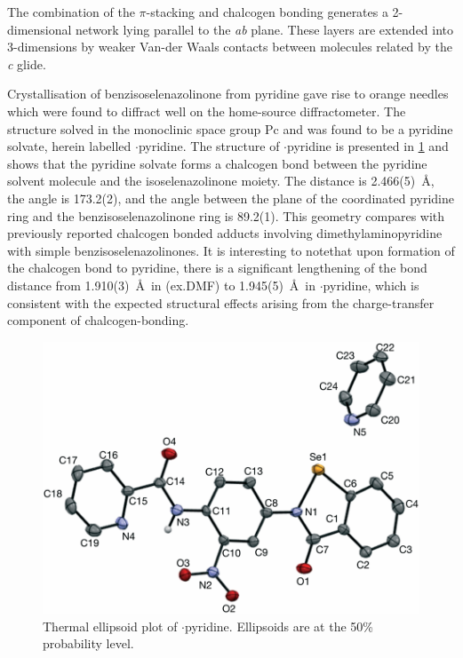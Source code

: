 \begin{refsection}
The combination of the $\pi$-stacking and chalcogen bonding generates a 2-dimensional network lying parallel to the \emph{ab} plane.
These layers are extended into 3-dimensions by weaker Van-der Waals contacts between molecules related by the \emph{c} glide.

Crystallisation of benzisoselenazolinone  from pyridine gave rise to orange needles which were found to diffract well on the home-source diffractometer.
The structure solved in the monoclinic space group Pc and was found to be a pyridine solvate, herein labelled $\cdot$pyridine.
The structure of $\cdot$pyridine is presented in \cref{fig:ebs-nitroamide-2py-py-xtal} and shows that the pyridine solvate forms a  chalcogen bond between the pyridine solvent molecule and the isoselenazolinone moiety.
The  distance is 2.466(5)~\AA, the  angle is 173.2(2)\degree, and the angle between the plane of the coordinated pyridine ring and the benzisoselenazolinone ring is 89.2(1)\degree.
This geometry compares with previously reported chalcogen bonded adducts involving dimethylaminopyridine with simple benzisoselenazolinones.\autocite{Fellowes2019}
It is interesting to notethat upon formation of the chalcogen bond to pyridine, there is a significant lengthening of the  bond distance from 1.910(3)~\AA~in (ex.DMF) to 1.945(5)~\AA~in $\cdot$pyridine, which is consistent with the expected structural effects arising from the charge-transfer component of chalcogen-bonding.\autocite{Fellowes2019,Pascoe2017}

\begin{figure}
    \centering
    \includegraphics[width=0.8\linewidth]{Figures/ebs-nitroamide-2py-py-xtal.pdf}
    \caption[Thermal ellipsoid plot of $\cdot$pyridine.]{Thermal ellipsoid plot of $\cdot$pyridine. Ellipsoids are at the 50\% probability level.}
    \label{fig:ebs-nitroamide-2py-py-xtal}
\end{figure}


\end{refsection}

